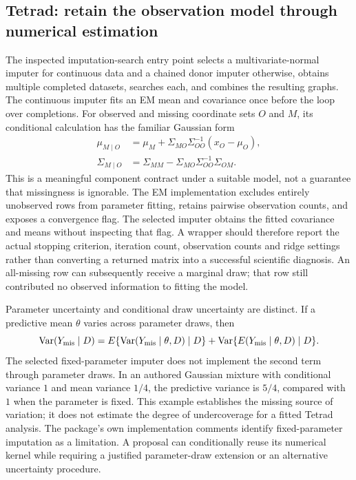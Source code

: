 \subsection*{Tetrad: retain the observation model through numerical estimation}
The inspected imputation-search entry point selects a multivariate-normal imputer for continuous data and a chained donor imputer otherwise, obtains multiple completed datasets, searches each, and combines the resulting graphs. The continuous imputer fits an EM mean and covariance once before the loop over completions. For observed and missing coordinate sets $O$ and $M$, its conditional calculation has the familiar Gaussian form
\begin{align*}
 \mu_{M\mid O}&=\mu_M+\Sigma_{MO}\Sigma_{OO}^{-1}(x_O-\mu_O),\\
 \Sigma_{M\mid O}&=\Sigma_{MM}-\Sigma_{MO}\Sigma_{OO}^{-1}\Sigma_{OM}.
\end{align*}
This is a meaningful component contract under a suitable model, not a guarantee that missingness is ignorable. The EM implementation excludes entirely unobserved rows from parameter fitting, retains pairwise observation counts, and exposes a convergence flag. The selected imputer obtains the fitted covariance and means without inspecting that flag. A wrapper should therefore report the actual stopping criterion, iteration count, observation counts and ridge settings rather than converting a returned matrix into a successful scientific diagnosis. An all-missing row can subsequently receive a marginal draw; that row still contributed no observed information to fitting the model.~\citep{exec25_jtm_tetrad}

Parameter uncertainty and conditional draw uncertainty are distinct. If a predictive mean $\theta$ varies across parameter draws, then
\[
 \operatorname{Var}(Y_{\rm mis}\mid D)
 =E\{\operatorname{Var}(Y_{\rm mis}\mid\theta,D)\mid D\}
  +\operatorname{Var}\{E(Y_{\rm mis}\mid\theta,D)\mid D\}.
\]
The selected fixed-parameter imputer does not implement the second term through parameter draws. In an authored Gaussian mixture with conditional variance $1$ and mean variance $1/4$, the predictive variance is $5/4$, compared with $1$ when the parameter is fixed. This example establishes the missing source of variation; it does not estimate the degree of undercoverage for a fitted Tetrad analysis. The package's own implementation comments identify fixed-parameter imputation as a limitation. A proposal can conditionally reuse its numerical kernel while requiring a justified parameter-draw extension or an alternative uncertainty procedure.~\citep{exec25_jtm_tetrad,exec25_jtm_choice}

